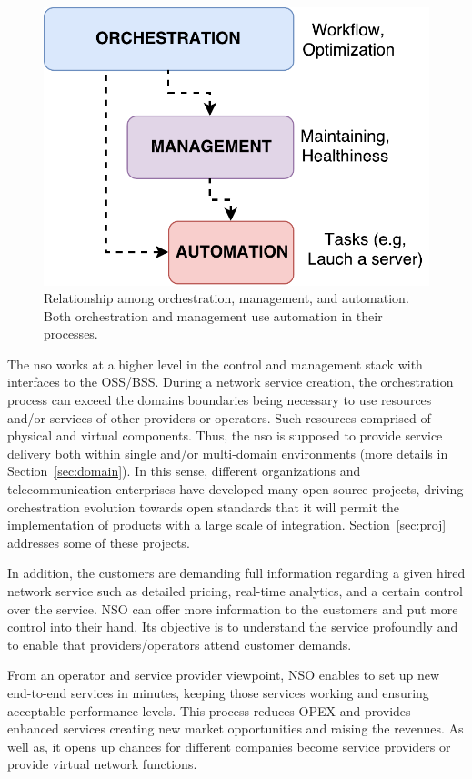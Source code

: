 \begin{figure}[t]
    \centering
    \includegraphics[scale=.4]{Figures/02_Background/OrchManaAut}
      \caption{Relationship among orchestration, management, and automation. Both orchestration and management use automation in their processes.}
      \label{diff}
\end{figure}

The \gls{nso} works at a higher level in the control and management stack with interfaces to the OSS/BSS. During a network service creation, the orchestration process can exceed the domains boundaries being necessary to use resources and/or services of other providers or operators. Such resources comprised of physical and virtual components. Thus, the \gls{nso} is supposed to provide service delivery both within single and/or multi-domain environments (more details in Section~\ref{sec:domain}). In this sense, different organizations and telecommunication enterprises have developed many open source projects, driving orchestration evolution towards open standards that it will permit the implementation of products with a large scale of integration. Section~\ref{sec:proj} addresses some of these projects.

In addition, the customers are demanding full information regarding a given hired network service such as detailed pricing, real-time analytics, and a certain control over the service. NSO can offer more information to the customers and put more control into their hand. Its objective is to understand the service profoundly and to enable that providers/operators attend customer demands. 

From an operator and service provider viewpoint, NSO enables to set up new end-to-end services in minutes, keeping those services working and ensuring acceptable performance levels. This process reduces OPEX and provides enhanced services creating new market opportunities and raising the revenues.  As well as, it opens up chances for different companies become service providers or provide virtual network functions.

